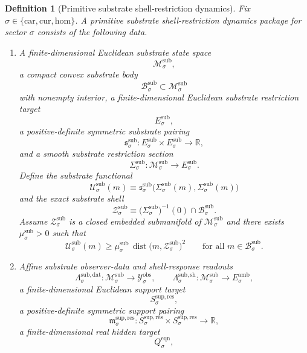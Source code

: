 \documentclass[11pt]{article}
\newcommand{\Car}{\mathrm{car}}
\newcommand{\Cur}{\mathrm{cur}}
\newcommand{\Hom}{\mathrm{hom}}
\newcommand{\DataSpace}[1]{\mathcal Y_{#1}^{\mathrm{obs}}}
\newcommand{\AmbientTarget}[1]{E_{#1}^{\mathrm{amb}}}
\newcommand{\EqnTarget}[1]{Q_{#1}^{\mathrm{eqn}}}
\newcommand{\ResTarget}[1]{S_{#1}^{\mathrm{sup,res}}}
\newcommand{\ResPair}[1]{\mathfrak m_{#1}^{\mathrm{sup,res}}}
\newcommand{\SubSpace}[1]{\mathcal M_{#1}^{\mathrm{sub}}}
\newcommand{\SubBody}[1]{\mathcal B_{#1}^{\mathrm{sub}}}
\newcommand{\SubTarget}[1]{E_{#1}^{\mathrm{sub}}}
\newcommand{\SubPair}[1]{\mathfrak s_{#1}^{\mathrm{sub}}}
\newcommand{\SubSection}[1]{\Sigma_{#1}^{\mathrm{sub}}}
\newcommand{\SubFunctional}[1]{\mathscr U_{#1}^{\mathrm{sub}}}
\newcommand{\SubShellSet}[1]{\mathcal Z_{#1}^{\mathrm{sub}}}
\newcommand{\SubData}[1]{\Lambda_{#1}^{\mathrm{sub,dat}}}
\newcommand{\SubShellMap}[1]{\Lambda_{#1}^{\mathrm{sub,sh}}}
\newtheorem{definition}{Definition}
\begin{document}
\begin{definition}[Primitive substrate shell-restriction dynamics]
\label{def:substrate}
Fix \(\sigma\in\{\Car,\Cur,\Hom\}\). A \emph{primitive substrate shell-restriction dynamics package} for sector \(\sigma\) consists of the following data.
\begin{enumerate}
    \item A finite-dimensional Euclidean substrate state space
    \[
    \SubSpace{\sigma},
    \]
    a compact convex substrate body
    \[
    \SubBody{\sigma}\subset\SubSpace{\sigma}
    \]
    with nonempty interior, a finite-dimensional Euclidean substrate restriction target
    \[
    \SubTarget{\sigma},
    \]
    a positive-definite symmetric substrate pairing
    \[
    \SubPair{\sigma}:
    \SubTarget{\sigma}\times\SubTarget{\sigma}\to\mathbb R,
    \]
    and a smooth substrate restriction section
    \[
    \SubSection{\sigma}:\SubSpace{\sigma}\to\SubTarget{\sigma}.
    \]
    Define the substrate functional
    \begin{equation}
    \SubFunctional{\sigma}(m)
    \equiv
    \SubPair{\sigma}\bigl(\SubSection{\sigma}(m),\SubSection{\sigma}(m)\bigr)
    \label{eq:subfunctional}
    \end{equation}
    and the exact substrate shell
    \begin{equation}
    \SubShellSet{\sigma}
    \equiv
    \bigl(\SubSection{\sigma}\bigr)^{-1}(0)\cap\SubBody{\sigma}.
    \label{eq:subshell}
    \end{equation}
    Assume \(\SubShellSet{\sigma}\) is a closed embedded submanifold of \(\SubSpace{\sigma}\) and there exists \(\mu_{\sigma}^{\mathrm{sub}}>0\) such that
    \begin{equation}
    \SubFunctional{\sigma}(m)
    \ge
    \mu_{\sigma}^{\mathrm{sub}}\,
    \operatorname{dist}\bigl(m,\SubShellSet{\sigma}\bigr)^{2}
    \qquad
    \text{for all }m\in\SubBody{\sigma}.
    \label{eq:subnormal}
    \end{equation}
    \item Affine substrate observer-data and shell-response readouts
    \[
    \SubData{\sigma}:\SubSpace{\sigma}\to\DataSpace{\sigma},
    \qquad
    \SubShellMap{\sigma}:\SubSpace{\sigma}\to\AmbientTarget{\sigma},
    \]
    a finite-dimensional Euclidean support target
    \[
    \ResTarget{\sigma},
    \]
    a positive-definite symmetric support pairing
    \[
    \ResPair{\sigma}:
    \ResTarget{\sigma}\times\ResTarget{\sigma}\to\mathbb R,
    \]
    a finite-dimensional real hidden target
    \[
    \EqnTarget{\sigma},
\]
\end{enumerate}
\end{definition}
\end{document}
